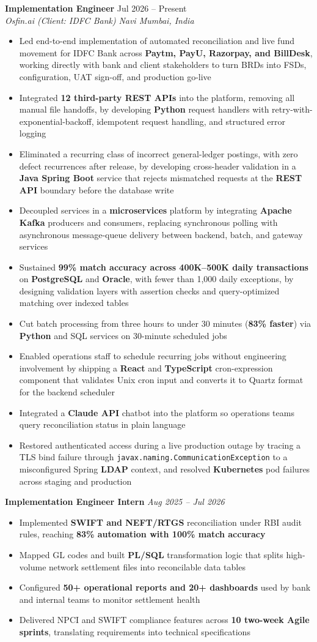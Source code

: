 \documentclass[letterpaper,10pt]{article}
\newcommand{\resumeItem}[1]{
  \item\small{
    {#1 \vspace{-2pt}}
  }
}
\newcommand{\resumeSubheading}[4]{
  \vspace{-2pt}\item
    \textbf{#1} \hfill {#2} \\
    \textit{\small#3} \hfill \textit{\small#4}
    \vspace{-6pt}
}
\newcommand{\resumeSubSubheading}[2]{
    \item
    \textbf{\small#1} \hfill \textit{\small#2}
    \vspace{-6pt}
}
\newcommand{\resumeItemListStart}{\begin{itemize}}
\newcommand{\resumeItemListEnd}{\end{itemize}\vspace{-5pt}}
\begin{document}
    \resumeSubheading
      {Implementation Engineer}{Jul 2026 -- Present}
      {Osfin.ai (Client: IDFC Bank)}{Navi Mumbai, India}
      \resumeItemListStart
        \resumeItem{Led end-to-end implementation of automated reconciliation and live fund movement for IDFC Bank across \textbf{Paytm, PayU, Razorpay, and BillDesk}, working directly with bank and client stakeholders to turn BRDs into FSDs, configuration, UAT sign-off, and production go-live}
        \resumeItem{Integrated \textbf{12 third-party REST APIs} into the platform, removing all manual file handoffs, by developing \textbf{Python} request handlers with retry-with-exponential-backoff, idempotent request handling, and structured error logging}
        \resumeItem{Eliminated a recurring class of incorrect general-ledger postings, with zero defect recurrences after release, by developing cross-header validation in a \textbf{Java Spring Boot} service that rejects mismatched requests at the \textbf{REST API} boundary before the database write}
        \resumeItem{Decoupled services in a \textbf{microservices} platform by integrating \textbf{Apache Kafka} producers and consumers, replacing synchronous polling with asynchronous message-queue delivery between backend, batch, and gateway services}
        \resumeItem{Sustained \textbf{99\% match accuracy across 400K--500K daily transactions} on \textbf{PostgreSQL} and \textbf{Oracle}, with fewer than 1,000 daily exceptions, by designing validation layers with assertion checks and query-optimized matching over indexed tables}
        \resumeItem{Cut batch processing from three hours to under 30 minutes (\textbf{83\% faster}) via \textbf{Python} and SQL services on 30-minute scheduled jobs}
        \resumeItem{Enabled operations staff to schedule recurring jobs without engineering involvement by shipping a \textbf{React} and \textbf{TypeScript} cron-expression component that validates Unix cron input and converts it to Quartz format for the backend scheduler}
        \resumeItem{Integrated a \textbf{Claude API} chatbot into the platform so operations teams query reconciliation status in plain language}
        \resumeItem{Restored authenticated access during a live production outage by tracing a TLS bind failure through \texttt{javax.naming.CommunicationException} to a misconfigured Spring \textbf{LDAP} context, and resolved \textbf{Kubernetes} pod failures across staging and production}
      \resumeItemListEnd

    \resumeSubSubheading
      {Implementation Engineer Intern}{Aug 2025 -- Jul 2026}
      \resumeItemListStart
        \resumeItem{Implemented \textbf{SWIFT and NEFT/RTGS} reconciliation under RBI audit rules, reaching \textbf{83\% automation with 100\% match accuracy}}
        \resumeItem{Mapped GL codes and built \textbf{PL/SQL} transformation logic that splits high-volume network settlement files into reconcilable data tables}
        \resumeItem{Configured \textbf{50+ operational reports and 20+ dashboards} used by bank and internal teams to monitor settlement health}
        \resumeItem{Delivered NPCI and SWIFT compliance features across \textbf{10 two-week Agile sprints}, translating requirements into technical specifications}
      \resumeItemListEnd
\end{document}
